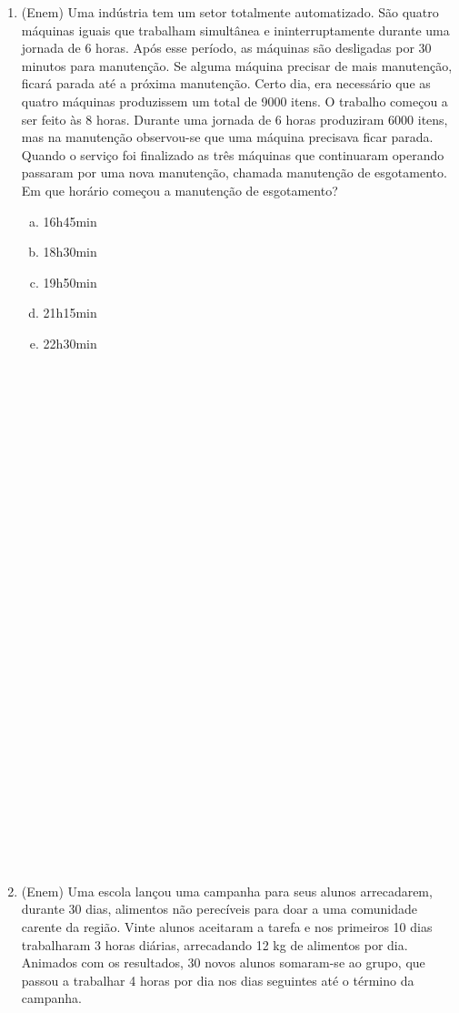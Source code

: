 \documentclass[a4paper,14pt]{article}
\begin{document}
\begin{multicols}{2}
\begin{enumerate}
		    \item (Enem) Uma indústria tem um setor totalmente automatizado. São quatro máquinas iguais que trabalham simultânea e ininterruptamente durante uma jornada de 6 horas. Após esse período, as máquinas são desligadas por 30 minutos para manutenção. Se alguma máquina precisar de mais manutenção, ficará parada até a próxima manutenção. Certo dia, era necessário que as quatro máquinas produzissem um total de 9000 itens. O trabalho começou a ser feito às 8 horas. Durante uma jornada de 6 horas produziram 6000 itens, mas na manutenção observou-se que uma máquina precisava ficar parada. Quando o serviço foi finalizado as três máquinas que continuaram operando passaram por uma nova manutenção, chamada manutenção de esgotamento. Em que horário começou a manutenção de esgotamento?
		    \begin{enumerate}[a)]
		    	\item 16h45min
		    	\item 18h30min
		    	\item 19h50min
		    	\item 21h15min
		    	\item 22h30min \\\\\\\\\\\\\\\\\\\\\\\\\\\\\\\\\\\\\\\\\\\\\\\\\\\\\\\\\\\\
		    \end{enumerate}
	    	\item (Enem) Uma escola lançou uma campanha para seus alunos arrecadarem, durante 30 dias, alimentos não perecíveis para doar a uma comunidade carente da região. Vinte alunos aceitaram a tarefa e nos primeiros 10 dias trabalharam 3 horas diárias, arrecadando 12 kg de alimentos por dia. Animados com os resultados, 30 novos alunos somaram-se ao grupo, que passou a trabalhar 4 horas por dia nos dias seguintes até o término da campanha.

\end{enumerate}
\end{multicols}
\end{document}
